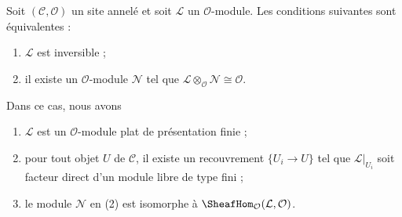 \begin{lemma}

\label{lemma-invertible}

Soit $(\mathcal{C}, \mathcal{O})$ un site annelé et soit $\mathcal{L}$ un
$\mathcal{O}$-module. Les conditions suivantes sont équivalentes :

\begin{enumerate}

\item $\mathcal{L}$ est inversible ;
\item il existe un $\mathcal{O}$-module $\mathcal{N}$
tel que
$\mathcal{L} \otimes_\mathcal{O} \mathcal{N} \cong \mathcal{O}$.

\end{enumerate}

Dans ce cas, nous avons

\begin{enumerate}

\item[(a)] $\mathcal{L}$ est un $\mathcal{O}$-module plat de présentation
finie ;
\item[b)] pour tout objet $U$ de $\mathcal{C}$, il existe un recouvrement
$\{U_i \to U\}$ tel que $\mathcal{L}|_{U_i}$ soit facteur direct d'un
module libre de type fini ;
\item[c)] le module $\mathcal{N}$ en (2) est isomorphe à
$\SheafHom_\mathcal{O}(\mathcal{L}, \mathcal{O})$.

\end{enumerate}

\end{lemma}


